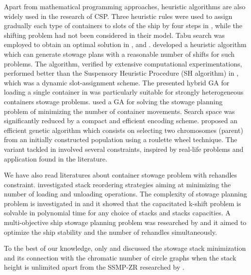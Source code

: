 \documentclass[review,3p,times,authoryear,12pt]{elsarticle}
\begin{document}
Apart from mathematical programming approaches, heuristic algorithms are also widely used in the research of CSP.
Three heuristic rules were used to assign gradually each type of containers to slots of the ship by four steps in \cite{scott1978loading}, while the shifting problem had not been considered in their model.
Tabu search was employed to obtain an optimal solution in \cite{wilson2001container}, \cite{bortfeldt2003parallel} and \cite{monaco2014terminal}.
\cite{ding2015stowage} developed a heuristic algorithm which can generate stowage plans with a reasonable number of shifts for such problems.
The algorithm, verified by extensive computational experimentations, performed better than the Suspensory Heuristic Procedure (SH algorithm) in \cite{avriel1998stowage}, which was a dynamic slot-assignment scheme.
The presented hybrid GA for loading a single container in \cite{bortfeldt2001hybrid} was particularly suitable for strongly heterogeneous containers stowage problems.
\cite{dubrovsky2002genetic}  used a GA for solving the stowage planning problem of minimizing the number of container movements.
Search space was significantly reduced by a compact and efficient encoding scheme.
\cite{kammarti2009evolutionary} proposed an efficient genetic algorithm which consists on selecting two chromosomes (parent) from an initially constructed population using a roulette wheel technique.
The variant tackled in \cite{cohen2017container} involved several constraints, inspired by real-life problems and application found in the literature.

We have also read literatures about container stowage problem with rehandles constraint.
\cite{malucelli2008stack} investigated stack reordering strategies aiming at minimizing the number of loading and unloading operations.
The complexity of stowage planning problem is investigated in \cite{tierney2014complexity} and it showed that the capacitated k-shift problem is solvable in polynomial time for any choice of stacks and stacks capacities.
A multi-objective ship stowage planning problem was researched by \cite{zhang2016multiobjective} and it aimed to optimize the ship stability and the number of rehandles simultaneously.

To the best of our knowledge, only \cite{avriel2000container} and \cite{jensen2010complexity} discussed the stowage stack minimization and its connection with the chromatic number of circle graphs when the stack height is unlimited apart from the SSMP-ZR researched by \cite{wang2014stowage}.
\end{document}

